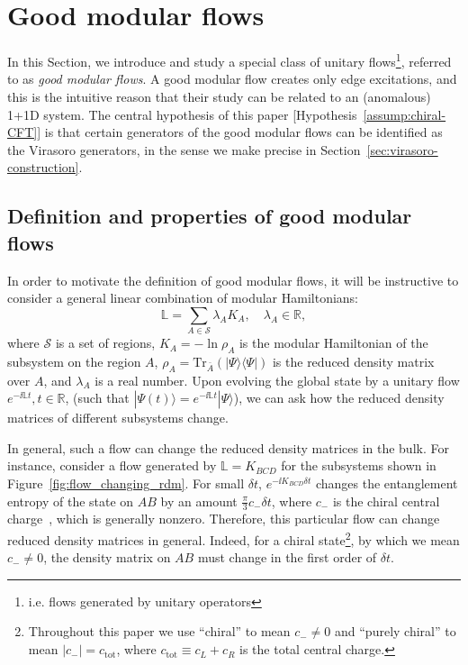 \documentclass[12pt, nofootinbib]{article}
\theoremstyle{plain}
\theoremstyle{assumption}
\theoremstyle{definition}
\theoremstyle{plain}
\theoremstyle{plain}
\theoremstyle{plain}
\theoremstyle{plain}
\theoremstyle{plain}
\newcommand{\calS}{{\mathcal S}}
\begin{document}
\section{Good modular flows}
\label{sec:good-modular-flows}

In this Section, we introduce and study a special class of unitary flows\footnote{i.e. flows generated by unitary operators}, referred to as \emph{good modular flows}.
A good modular flow creates only edge excitations, 
and this is the 
intuitive reason that their study can be related to 
an (anomalous) 1+1D system.
The central hypothesis of this paper [Hypothesis~\ref{assump:chiral-CFT}] is that certain generators of the good modular flows can be identified as the Virasoro generators, in the sense we make precise in Section~\ref{sec:virasoro-construction}.

\subsection{Definition and properties of good modular flows}
\label{sec:def-good-modular-flows}
In order to motivate the definition of good modular flows, it will be instructive to consider a general linear combination of modular Hamiltonians:  
\begin{equation}
    \mathbb{L} = \sum_{A\in \calS} \lambda_A K_A, \quad \lambda_A \in \mathbb{R}, 
    \label{eq:modular_generator_general}
\end{equation}
where $\calS$ is a set of regions,  $K_A = -\ln \rho_A$ is the modular Hamiltonian of the subsystem on the region $A$, $\rho_A = \text{Tr}_{\bar{A}}\left( {|\Psi\rangle}{\langle \Psi|}\right)$ is the reduced density matrix over $A$, and $\lambda_A$ is a real number. Upon evolving the global state by a unitary flow $e^{-\ii \mathbb{L} t}, t\in \mathbb{R}$, (such that $|\Psi(t)\rangle = e^{-\ii \mathbb{L} t}|\Psi\rangle$), we can ask how the reduced density matrices of different subsystems change. 

In general, such a flow can change the reduced density matrices in the bulk. For instance, consider a flow generated by $\mathbb{L} = K_{BCD}$ for the subsystems shown in Figure~\ref{fig:flow_changing_rdm}. For small $\delta t$, $e^{-\ii K_{BCD}\delta t}$ changes the entanglement entropy of the state on $AB$ by an amount $\frac{\pi}{3}c_-\delta t$, where $c_-$ is the chiral central charge~\cite{Kim2021,Kim:2021tse}, which is generally nonzero. Therefore, this particular flow can change reduced density matrices in general. Indeed, for a chiral state\footnote{Throughout this paper we use ``chiral'' to mean $c_- \neq 0$ and ``purely chiral'' to mean $|c_-| = c_\text{tot}$, where $c_\text{tot} \equiv c_L + c_R$ is the total central charge.}, by which we mean $c_- \ne 0$, the density matrix on $AB$ must change in the first order of $\delta t$.
\end{document}
